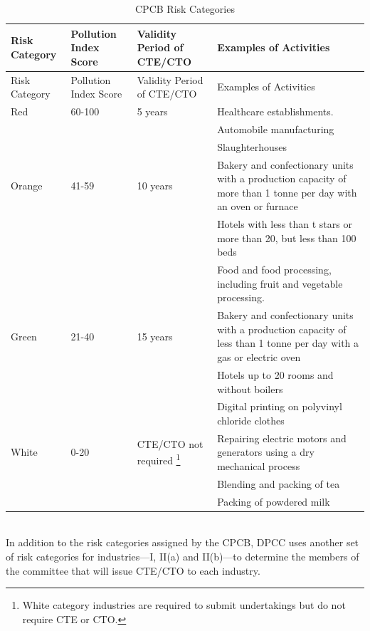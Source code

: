 \documentclass[a4paper, 12pt]{article}
\newcommand\tabitem{\makebox[1em][r]{\textbullet~}}
\begin{document}
\begin{longtable}{p{2cm}>{\raggedright}p{3.5cm}>{\raggedright}p{3.5cm}>{\raggedright\arraybackslash}p{6cm}}
\caption{CPCB Risk Categories} \\
\toprule
Risk Category & Pollution Index Score & Validity Period of CTE/CTO & Examples of Activities \\
\midrule
\endfirsthead
Risk Category & Pollution Index Score & Validity Period of CTE/CTO & Examples of Activities \\
\midrule
\endhead
\endfoot
\endlastfoot
Red & 60-100 & 5 years & \tabitem Healthcare establishments. \\
 &  &  &   \tabitem Automobile manufacturing \\
  &  &  &  \tabitem Slaughterhouses \\
Orange & 41-59 & 10 years &  \tabitem Bakery and confectionary units with a production capacity of more than 1 tonne per day with an oven or furnace  \\
 &  &  & \tabitem Hotels with less than t stars or more than 20, but less than 100 beds \\
 &  &  & \tabitem Food and food processing, including fruit and vegetable processing.  \\
Green & 21-40 & 15 years & \tabitem Bakery and confectionary units with a production capacity of less than 1 tonne per day with a gas or electric oven \\
 &  &  &  \tabitem Hotels up to 20 rooms and without boilers \\
 &  &  & \tabitem Digital printing on polyvinyl chloride clothes \\
White & 0-20 & CTE/CTO not required \footnote{White category industries are required to submit undertakings but do not require CTE or CTO.} & \tabitem Repairing electric motors and generators using a dry mechanical process \\
 &  &  & \tabitem Blending and packing of tea \\
 &  &  & \tabitem Packing of powdered milk \\
 \bottomrule
\end{longtable}
\textit{\parencite{CPCBrc}} \\
                                  
                 In addition to the risk categories assigned by the CPCB, DPCC uses another set of risk categories for industries—I, II(a) and II(b)—to determine the members of the committee that will issue CTE/CTO to each industry.\\																				
                 
\end{document}
